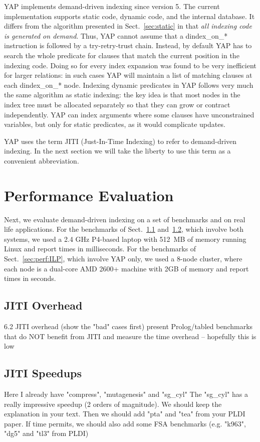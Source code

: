 \documentclass{llncs}
\newcommand{\instr}[1]{\textsf{#1}}
\newcommand{\TryRetryTrust}{\mbox{\instr{try-retry-trust}}\xspace}
\newcommand{\jitiSTAR}{\mbox{\instr{dindex\_on\_*}}\xspace}
\newcommand{\JITI}{demand-driven indexing\xspace}
\begin{document}
YAP implements \JITI since version 5. The current implementation
supports static code, dynamic code, and the internal database. It
differs from the algorithm presented in Sect.~\ref{sec:static} in that
\emph{all indexing code is generated on demand}. Thus, YAP cannot
assume that a \jitiSTAR instruction is followed by a \TryRetryTrust
chain. Instead, by default YAP has to search the whole predicate for
clauses that match the current position in the indexing code. Doing so
for every index expansion was found to be very inefficient for larger
relations: in such cases YAP will maintain a list of matching clauses
at each \jitiSTAR node. Indexing dynamic predicates in YAP follows
very much the same algorithm as static indexing: the key idea is that
most nodes in the index tree must be allocated separately so that they
can grow or contract independently. YAP can index arguments where some
clauses have unconstrained variables, but only for static predicates,
as it would complicate updates.

YAP uses the term JITI (Just-In-Time Indexing) to refer to \JITI. In
the next section we will take the liberty to use this term as a
convenient abbreviation.


\section{Performance Evaluation} \label{sec:perf}
Next, we evaluate \JITI on a set of benchmarks and on real life
applications. For the benchmarks of Sect.~\ref{sec:perf:overhead}
and~\ref{sec:perf:speedups}, which involve both systems, we used a 2.4
GHz P4-based laptop with 512~MB of memory running Linux and report
times in milliseconds. For the benchmarks of Sect.~\ref{sec:perf:ILP},
which involve YAP only, we used a 8-node cluster, where each node is a
dual-core AMD 2600+ machine with 2GB of memory
%
%
and report times in seconds.

\subsection{JITI Overhead} \label{sec:perf:overhead}
   6.2 JITI overhead (show the "bad" cases first)
       present Prolog/tabled benchmarks that do NOT benefit from JITI
       and measure the time overhead -- hopefully this is low

\subsection{JITI Speedups} \label{sec:perf:speedups}
       Here I already have "compress", "mutagenesis" and "sg\_cyl"
       The "sg\_cyl" has a really impressive speedup (2 orders of
       magnitude).  We should keep the explanation in your text.
       Then we should add "pta" and "tea" from your PLDI paper.
       If time permits, we should also add some FSA benchmarks
       (e.g. "k963", "dg5" and "tl3" from PLDI)
\end{document}
